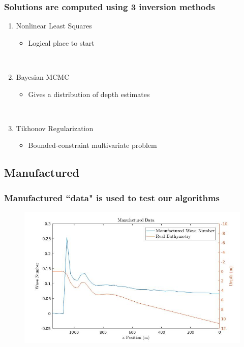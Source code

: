 \documentclass[7pt]{beamer}
\begin{document}
\begin{frame}
	\frametitle{Solutions are computed using 3 inversion methods}
		\centering
		\begin{enumerate}
			\item Nonlinear Least Squares
			\begin{itemize}
				\item Logical place to start
			\end{itemize}
			$\,$\\
			\item Bayesian MCMC
			\begin{itemize}
				\item Gives a distribution of depth estimates
			\end{itemize}
			$\,$\\
			\item Tikhonov Regularization
			\begin{itemize}
				\item Bounded-constraint multivariate problem
			\end{itemize}
		\end{enumerate}
\end{frame}

\subsection{Manufactured}

\begin{frame}
 	\frametitle{Manufactured ``data" is used to test our algorithms}
		\begin{figure}
			\includegraphics[width=1.0\linewidth]{img/Manufactured_data.jpg}
		\end{figure}
\end{frame}
\end{document}

